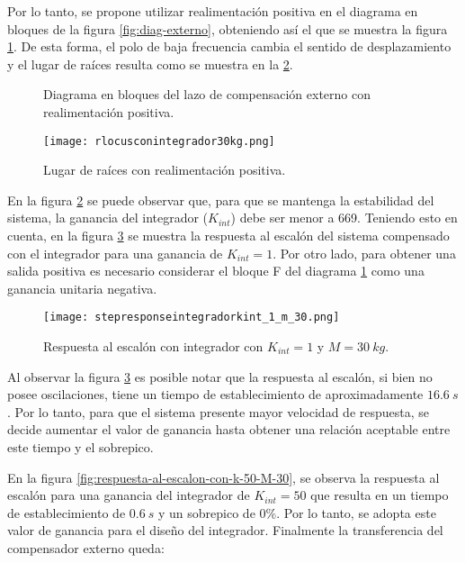 Por lo tanto, se propone utilizar realimentación positiva en el diagrama en bloques de la figura \ref{fig:diag-externo}, obteniendo así el que se muestra la figura \ref{fig:diag-externo_real_positiva}. De esta forma, el polo de baja frecuencia cambia el sentido de desplazamiento y el lugar de raíces resulta como se muestra en la \ref{fig:lugar-de-raices-con-integrador-analog}.


\begin{figure}[H]
	\centering
	
	\caption{Diagrama en bloques del lazo de compensación externo con realimentación positiva.}	
	\label{fig:diag-externo_real_positiva}
\end{figure}


\begin{figure}[H]
	\centering
	\texttt{[image: rlocusconintegrador30kg.png]}
	\caption{Lugar de raíces con realimentación positiva.}
	\label{fig:lugar-de-raices-con-integrador-analog}
\end{figure}
 
\noindent En la figura \ref{fig:lugar-de-raices-con-integrador-analog} se puede observar que, para que se mantenga la estabilidad del sistema, la ganancia del integrador ($K_{int}$) debe ser menor a 669. Teniendo esto en cuenta, en la figura \ref{fig:respuesta-al-escalon-con-k-1-M-30-analog} se muestra la respuesta al escalón del sistema compensado con el integrador para una ganancia de $K_{int}=1$. Por otro lado, para obtener una salida positiva es necesario considerar el bloque F del diagrama \ref{fig:diag-externo_real_positiva} como una ganancia unitaria negativa.

\begin{figure}[H]
	\centering
	\texttt{[image: stepresponseintegradorkint\_1\_m\_30.png]}
	\caption{Respuesta al escalón con integrador con $K_{int} =1$ y $M=30\:kg$.}
	\label{fig:respuesta-al-escalon-con-k-1-M-30-analog}
\end{figure}

Al observar la figura \ref{fig:respuesta-al-escalon-con-k-1-M-30-analog} es posible notar que la respuesta al escalón, si bien no posee oscilaciones, tiene un tiempo de establecimiento de aproximadamente $16.6 \:s$. Por lo tanto, para que el sistema presente mayor velocidad de respuesta, se decide aumentar el valor de ganancia hasta obtener una relación aceptable entre este tiempo y el sobrepico.



\noindent En la figura \ref{fig:respuesta-al-escalon-con-k-50-M-30}, se observa la respuesta al escalón para una ganancia del integrador de $K_{int}=50$ que resulta en un tiempo de establecimiento de $0.6\:s$ y un sobrepico de 0\%. Por lo tanto, se adopta este valor de ganancia para el diseño del integrador. Finalmente la transferencia del compensador externo queda:

